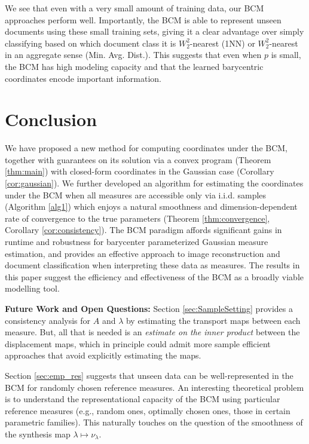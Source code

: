 \documentclass[nohyperref]{article}
\theoremstyle{definition}
\begin{document}
We see that even with a very small amount of training data, our BCM approaches perform well.  Importantly, the BCM is able to represent unseen documents using these small training sets, giving it a clear advantage over simply classifying based on which document class it is $W_2^2$-nearest (1NN) or $W_2^2$-nearest in an aggregate sense (Min. Avg. Dist.).  This suggests that even when $p$ is small, the BCM has high modeling capacity and that the learned barycentric coordinates encode important information.

\section{Conclusion}

We have proposed a new method for computing coordinates under the BCM, together with guarantees on its solution via a convex program (Theorem \ref{thm:main}) with closed-form coordinates in the Gaussian case (Corollary \ref{cor:gaussian}).  We further developed an algorithm for estimating the coordinates under the BCM when all measures are accessible only via i.i.d. samples (Algorithm \ref{alg1}) which enjoys a natural smoothness and dimension-dependent rate of convergence to the true parameters (Theorem \ref{thm:convergence}, Corollary \ref{cor:consistency}).  The BCM paradigm affords significant gains in runtime and robustness for barycenter parameterized Gaussian measure estimation, and provides an effective approach to image reconstruction and document classification when interpreting these data as measures.  The results in this paper suggest the efficiency and effectiveness of the BCM as a broadly viable modelling tool.

\textbf{Future Work and Open Questions:}  Section \ref{sec:SampleSetting} provides a consistency analysis for $A$ and $\lambda$ by estimating the transport maps between each measure.  But, all that is needed is an \emph{estimate on the inner product} between the displacement maps, which in principle could admit more sample efficient approaches that avoid explicitly estimating the maps.  

Section \ref{sec:emp_res} suggests that unseen data can be well-represented in the BCM for randomly chosen reference measures.  An interesting theoretical problem is to understand the representational capacity of the BCM using particular reference measures (e.g., random ones, optimally chosen ones, those in certain parametric families).  This naturally touches on the question of the smoothness of the synthesis map $\lambda \mapsto \nu_{\lambda}.$ 
\end{document}
